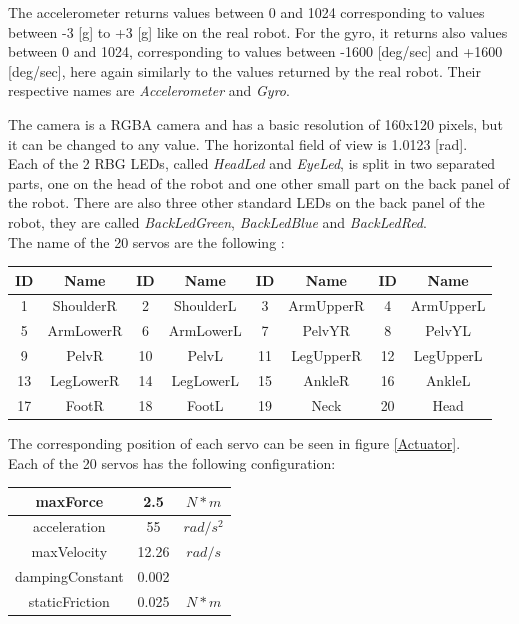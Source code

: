 \documentclass[a4paper, 12pt]{article}  		%
\begin{document}
The accelerometer returns values between 0 and 1024 corresponding to values between -3 [g] to +3 [g] like on the real robot. For the gyro, it returns also values between 0 and 1024, corresponding to values between -1600 [deg/sec] and +1600 [deg/sec], here again similarly to the values returned by the real robot. Their respective names are \textit{Accelerometer} and \textit{Gyro}.

The camera is a RGBA camera and has a basic resolution of 160x120 pixels, but it can be changed to any value. The horizontal field of view is 1.0123 [rad].\\

Each of the 2 RBG LEDs, called \textit{HeadLed} and \textit{EyeLed}, is split in two separated parts, one on the head of the robot and one other small part on the back panel of the robot. There are also three other standard LEDs on the back panel of the robot, they are called \textit{BackLedGreen}, \textit{BackLedBlue} and \textit{BackLedRed}.\\

The name of the 20 servos are the following :

\begin{table}[H]
\begin{center}
\begin{tabular}{ | c | c | c | c | c | c | c | c |  }
\hline
ID & Name & ID & Name & ID & Name & ID & Name\\ 
\hline
\hline
1 & ShoulderR & 2 & ShoulderL & 3 & ArmUpperR & 4 & ArmUpperL \\
\hline
5 & ArmLowerR & 6 & ArmLowerL & 7 & PelvYR & 8 & PelvYL \\
\hline
9 & PelvR & 10 & PelvL & 11 & LegUpperR & 12 & LegUpperL \\
\hline
13 & LegLowerR & 14 & LegLowerL & 15 & AnkleR & 16 & AnkleL \\
\hline
17 & FootR & 18 & FootL & 19 & Neck & 20 & Head \\
\hline
\end{tabular}
\label{tab::servosName}
\end{center}
\end{table}

The corresponding position of each servo can be seen in figure \ref{Actuator}.\\
Each of the 20 servos has the following configuration:
\begin{table}[H]
\begin{center}
\begin{tabular}{ | c | c | c | }
\hline
maxForce & 2.5 & $N*m$ \\ 
\hline
acceleration & 55 & $rad/s^{2}$ \\ 
\hline
maxVelocity & 12.26 & $rad/s$ \\ 
\hline
dampingConstant & 0.002 & $ $ \\ 
\hline
staticFriction & 0.025 & $N*m$ \\ 
\hline
\end{tabular}
\label{tab::servosConfig}
\end{center}
\end{table}
\end{document}
